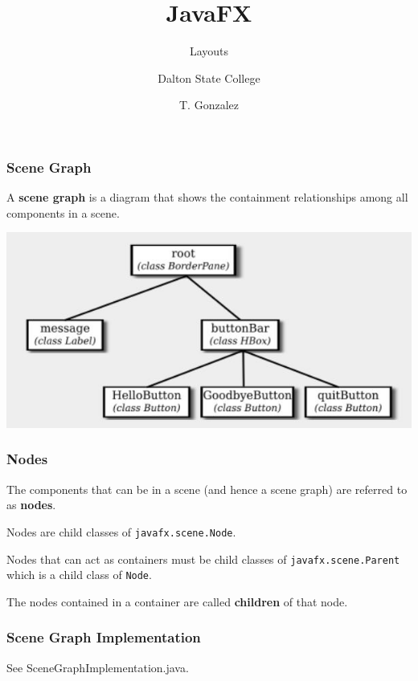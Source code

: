 \documentclass{beamer}
\title[Layouts]{JavaFX}
\subtitle{Layouts} %
\author[]{Dalton State College}
\date[T. Gonzalez]{T. Gonzalez}
\newcommand{\mil}[1]{\texttt{#1}}
\begin{document}
\begin{frame}

	\titlepage
	
\end{frame}

\begin{frame}
    
    \frametitle{Scene Graph}
    
    A \textbf{scene graph} is a diagram that shows the containment relationships among all components in a scene.
    
    \bigskip
    
    \begin{center}
        \includegraphics[scale=0.5]{scene_graph.jpg}
    \end{center}
    
\end{frame}

\begin{frame}[fragile]

	\frametitle{Nodes}
	
    The components that can be in a scene (and hence a scene graph) are referred to as \textbf{nodes}.
    
    \bigskip
    
    Nodes are child classes of \mil{javafx.scene.Node}.
    
    \bigskip
    
    Nodes that can act as containers must be child classes of \mil{javafx.scene.Parent} which is a child class of \mil{Node}.
    
    \bigskip
    
    The nodes contained in a container are called \textbf{children} of that node.
	
\end{frame}

\begin{frame}[fragile]

	\frametitle{Scene Graph Implementation}
	
	See SceneGraphImplementation.java.  

\end{frame}
	
\end{document}
